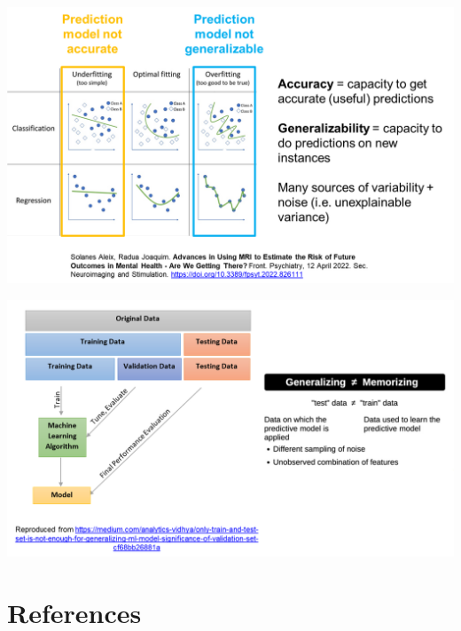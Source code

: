 \documentclass[
  letterpaper,
  DIV=11,
  numbers=noendperiod]{scrreprt}
\begin{document}
\includegraphics{./images/paste-FC3A1160.png}

\includegraphics{./images/paste-7D73149D.png}


\hypertarget{references-2}{%
\chapter*{References}\label{references-2}}
\end{document}
